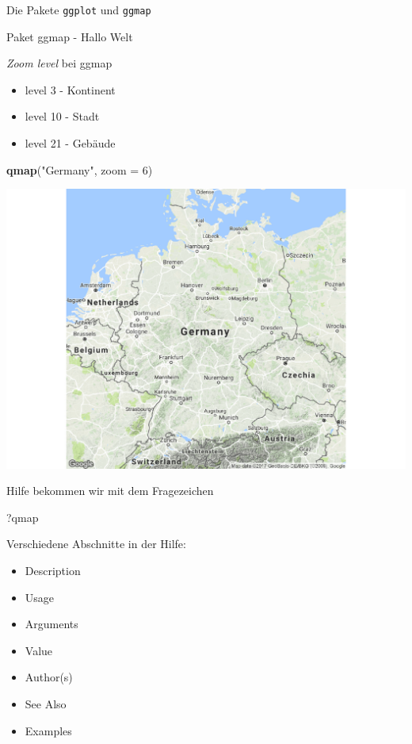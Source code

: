 \documentclass[ignorenonframetext,]{beamer}
\newenvironment{Shaded}{}{}
\newcommand{\KeywordTok}[1]{\textcolor[rgb]{0.00,0.44,0.13}{\textbf{{#1}}}}
\newcommand{\DataTypeTok}[1]{\textcolor[rgb]{0.56,0.13,0.00}{{#1}}}
\newcommand{\DecValTok}[1]{\textcolor[rgb]{0.25,0.63,0.44}{{#1}}}
\newcommand{\StringTok}[1]{\textcolor[rgb]{0.25,0.44,0.63}{{#1}}}
\newcommand{\NormalTok}[1]{{#1}}
\providecommand{\tightlist}{%
\setlength{\itemsep}{0pt}\setlength{\parskip}{0pt}}
\begin{document}
\begin{frame}[fragile]{Die Pakete \texttt{ggplot} und \texttt{ggmap}}
\begin{block}{Paket ggmap - Hallo Welt}
\end{block}

\begin{block}{\emph{Zoom level} bei ggmap}

\begin{itemize}
\tightlist
\item
  level 3 - Kontinent
\item
  level 10 - Stadt
\item
  level 21 - Gebäude
\end{itemize}

\begin{Shaded}
\begin{Highlighting}[]
\KeywordTok{qmap}\NormalTok{(}\StringTok{"Germany"}\NormalTok{, }\DataTypeTok{zoom =} \DecValTok{6}\NormalTok{)}
\end{Highlighting}
\end{Shaded}

\includegraphics{R_intern_files/figure-beamer/unnamed-chunk-255-1.pdf}

\end{block}

\begin{block}{Hilfe bekommen wir mit dem Fragezeichen}

\begin{Shaded}
\begin{Highlighting}[]
\NormalTok{?qmap}
\end{Highlighting}
\end{Shaded}

Verschiedene Abschnitte in der Hilfe:

\begin{itemize}
\tightlist
\item
  Description
\item
  Usage
\item
  Arguments
\item
  Value
\item
  Author(s)
\item
  See Also
\item
  Examples
\end{itemize}


\end{block}
\end{frame}
\end{document}
